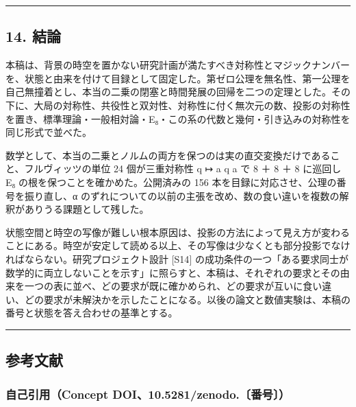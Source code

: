 \documentclass[
  a4paper,
]{ltjsarticle}
\begin{document}
\begin{center}\rule{0.5\linewidth}{0.5pt}\end{center}

\subsection{14. 結論}\label{ux7d50ux8ad6}

本稿は、背景の時空を置かない研究計画が満たすべき対称性とマジックナンバーを、状態と由来を付けて目録として固定した。第ゼロ公理を無名性、第一公理を自己無撞着とし、本当の二乗の閉塞と時間発展の回帰を二つの定理とした。その下に、大局の対称性、共役性と双対性、対称性に付く無次元の数、投影の対称性を置き、標準理論・一般相対論・E₈・この系の代数と幾何・引き込みの対称性を同じ形式で並べた。

数学として、本当の二乗とノルムの両方を保つのは実の直交変換だけであること、フルヴィッツの単位
24 個が三重対称性 q ↦ a q a で 8 ＋ 8 ＋ 8 に巡回し E₈
の根を保つことを確かめた。公開済みの 156
本を目録に対応させ、公理の番号を振り直し、α
のずれについての以前の主張を改め、数の食い違いを複数の解釈がありうる課題として残した。

状態空間と時空の写像が難しい根本原因は、投影の方法によって見え方が変わることにある。時空が安定して読める以上、その写像は少なくとも部分投影でなければならない。研究プロジェクト設計
{[}S14{]}
の成功条件の一つ「ある要求同士が数学的に両立しないことを示す」に照らすと、本稿は、それぞれの要求とその由来を一つの表に並べ、どの要求が既に確かめられ、どの要求が互いに食い違い、どの要求が未解決かを示したことになる。以後の論文と数値実験は、本稿の番号と状態を答え合わせの基準とする。

\begin{center}\rule{0.5\linewidth}{0.5pt}\end{center}

\subsection{参考文献}\label{ux53c2ux8003ux6587ux732e}

\subsubsection{自己引用（Concept
DOI、10.5281/zenodo.〔番号〕）}\label{ux81eaux5df1ux5f15ux7528concept-doi10.5281zenodo.ux756aux53f7}
\end{document}
